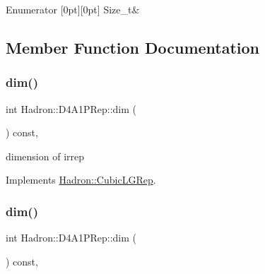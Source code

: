 \begin{DoxyEnumFields}{Enumerator}
[0pt][0pt]{}\mbox{\label{structHadron_1_1D4A1PRep_ad407ed6221816c11ea57650ee4cbd943a6299c4e0810e50605d6dc6751f7f7bab}} 
Size\+\_\+t&\\
\hline

\end{DoxyEnumFields}


\subsection{Member Function Documentation}
\mbox{\label{structHadron_1_1D4A1PRep_a3b84dbb23476d76b192c0440aafb9e92}} 
\subsubsection{\texorpdfstring{dim()}{dim()}\hspace{0.1cm}{\footnotesize\ttfamily [1/3]}}
{\footnotesize\ttfamily int Hadron\+::\+D4\+A1\+P\+Rep\+::dim (\begin{DoxyParamCaption}{ }\end{DoxyParamCaption}) const\hspace{0.3cm}{\ttfamily [inline]}, {\ttfamily [virtual]}}

dimension of irrep 

Implements \mbox{\hyperlink{structHadron_1_1CubicLGRep_a3acbaea26503ed64f20df693a48e4cdd}{Hadron\+::\+Cubic\+L\+G\+Rep}}.

\mbox{\label{structHadron_1_1D4A1PRep_a3b84dbb23476d76b192c0440aafb9e92}} 
\subsubsection{\texorpdfstring{dim()}{dim()}\hspace{0.1cm}{\footnotesize\ttfamily [2/3]}}
{\footnotesize\ttfamily int Hadron\+::\+D4\+A1\+P\+Rep\+::dim (\begin{DoxyParamCaption}{ }\end{DoxyParamCaption}) const\hspace{0.3cm}{\ttfamily [inline]}, {\ttfamily [virtual]}}

